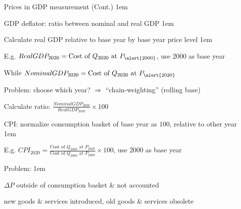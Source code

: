 \documentclass[11pt,aspectratio=43]{beamer}
\let\olditemize=\itemize
\let\endolditemize=\enditemize
\renewenvironment{itemize}{\olditemize \itemsep1em}{\endolditemize}
\let\oldenumerate=\enumerate
\let\endoldenumerate=\endenumerate
\renewenvironment{enumerate}{\oldenumerate \itemsep1em}{ \endoldenumerate}
\theoremstyle{definition}
\begin{document}
\begin{frame}{Prices in GDP measurement (Cont.)}
\label{slide:Prices_in_GDP_measurement__Cont__}
    \begin{itemize}
        \item GDP deflator: ratio between nominal and real GDP
        \begin{enumerate}
            \item Calculate real GDP relative to base year by base year \alert{price level}
            \begin{itemize}
                \item E.g. $ RealGDP_{2020} = \text{Cost of } Q_{2020} \text{ at } P_{\alert{2000}} $, use $ 2000 $ as base year
                \item While $ NominalGDP_{2020} = \text{Cost of } Q_{2020} \text{ at } P_{\alert{2020}} $
                \item \alert{Problem}: choose which year? $ \Rightarrow  $ ``\alert{chain-weighting}'' (rolling base)
            \end{itemize}
            \item Calculate ratio: $ \frac{NominalGDP_{2020}}{RealGDP_{2020}} \times 100 $
        \end{enumerate}
        \item CPI: normalize \alert{consumption basket} of \alert{base year} as $ 100 $, relative to \alert{other year}
        \begin{itemize}
            \item E.g. $ CPI_{2020} = \frac{\text{Cost of } Q_{2000} \text{ at } P_{2020}}{\text{Cost of } Q_{2000} \text{ at } P_{2000}} \times 100 $, use $ 2000 $ as base year
            \item \alert{Problem}:
            \begin{enumerate}
                \item $ \Delta P $ outside of consumption basket \&  not accounted
                \item new goods \& services introduced, old goods \& services obsolete
            \end{enumerate}
        \end{itemize}
    \end{itemize}
\end{frame}
\end{document}
